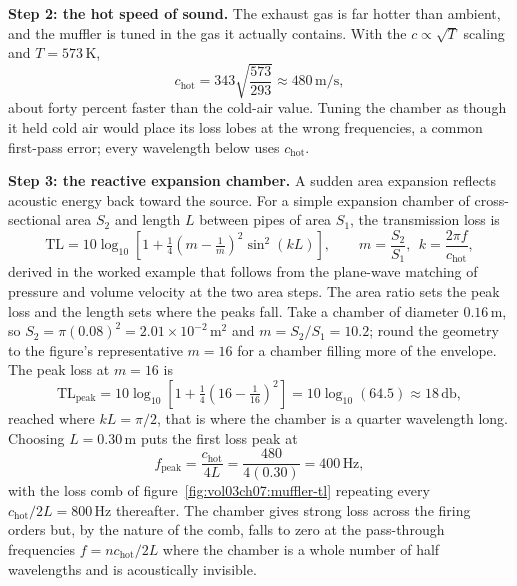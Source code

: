 \textbf{Step 2: the hot speed of sound.} The exhaust gas is far hotter than
ambient, and the muffler is tuned in the gas it actually contains. With the
$c\propto\sqrt{T}$ scaling and $T=573\,\si{\kelvin}$,
\[
c_{\text{hot}} = 343\sqrt{\frac{573}{293}} \approx 480\,\si{\meter\per\second},
\]
about forty percent faster than the cold-air value. Tuning the chamber as
though it held cold air would place its loss lobes at the wrong
frequencies, a common first-pass error; every wavelength below uses
$c_{\text{hot}}$.

\textbf{Step 3: the reactive expansion chamber.} A sudden area expansion
reflects acoustic energy back toward the source. For a simple expansion
chamber of cross-sectional area $S_2$ and length $L$ between pipes of area
$S_1$, the transmission loss is
\[
\text{TL} = 10\log_{10}\!\left[1 + \tfrac14\left(m - \tfrac{1}{m}\right)^2
            \sin^2(kL)\right],
\qquad m = \frac{S_2}{S_1},\ \ k = \frac{2\pi f}{c_{\text{hot}}},
\]
derived in the worked example that follows from the plane-wave matching of
pressure and volume velocity at the two area steps. The area ratio sets the
peak loss and the length sets where the peaks fall. Take a chamber of
diameter $0.16\,\si{\meter}$, so
$S_2 = \pi(0.08)^2 = 2.01\times 10^{-2}\,\si{\meter\squared}$ and
$m = S_2/S_1 = 10.2$; round the geometry to the figure's representative
$m=16$ for a chamber filling more of the envelope. The peak loss at
$m=16$ is
\[
\text{TL}_{\text{peak}} = 10\log_{10}\!\left[1 + \tfrac14
            \left(16 - \tfrac{1}{16}\right)^2\right]
            = 10\log_{10}(64.5) \approx 18\,\si{\decibel},
\]
reached where $kL = \pi/2$, that is where the chamber is a quarter
wavelength long. Choosing $L = 0.30\,\si{\meter}$ puts the first loss peak
at
\[
f_{\text{peak}} = \frac{c_{\text{hot}}}{4L}
               = \frac{480}{4(0.30)} = 400\,\si{\hertz},
\]
with the loss comb of figure~\ref{fig:vol03ch07:muffler-tl} repeating every
$c_{\text{hot}}/2L = 800\,\si{\hertz}$ thereafter. The chamber gives
strong loss across the firing orders but, by the nature of the comb, falls
to zero at the pass-through frequencies $f = nc_{\text{hot}}/2L$ where the
chamber is a whole number of half wavelengths and is acoustically invisible.



